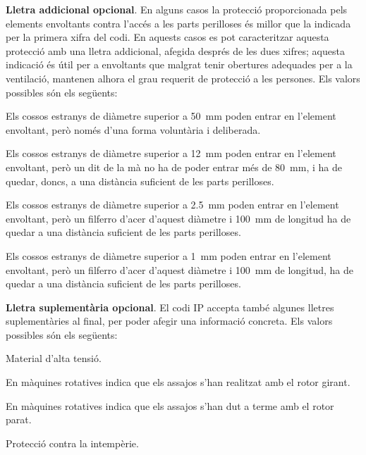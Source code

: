 \textbf{Lletra addicional opcional}. En alguns casos la protecció
proporcionada pels elements envoltants contra l'accés a les parts
perilloses és millor que la indicada per la primera xifra del codi.
En aquests casos es pot caracteritzar aquesta protecció amb una
lletra addicional, afegida després de les dues xifres; aquesta indicació és útil per a  envoltants que malgrat tenir obertures adequades per a la ventilació,  mantenen alhora el
grau requerit de protecció a les persones. Els valors possibles són
els següents:
\begin{list}{}
	{\setlength{\labelwidth}{10mm} \setlength{\leftmargin}{15mm} \setlength{\labelsep}{5mm}}
	\item[A] Els  cossos estranys de diàmetre superior a
	\qty{50}{mm}    poden entrar en l'element envoltant, però només d'una forma voluntària i deliberada.
	\item[B] Els  cossos estranys de diàmetre superior a \qty{12}{mm}
	poden entrar en l'element envoltant, però un dit de la mà no ha de poder entrar més de \qty{80}{mm}, i
	ha de quedar, doncs, a una distància    suficient de les parts perilloses.
	\item[C] Els  cossos estranys de diàmetre superior a \qty{2,5}{mm}
	poden entrar en l'element envoltant, però un filferro d'acer d'aquest diàmetre i \qty{100}{mm}
	de longitud ha de quedar a una distància suficient de les parts perilloses.
	\item[D] Els  cossos estranys de diàmetre superior a \qty{1}{mm}
	poden entrar en l'element envoltant, però un filferro d'acer d'aquest diàmetre i \qty{100}{mm}
	de longitud, ha de quedar a una distància suficient de les parts perilloses.
\end{list}

\textbf{Lletra suplementària opcional}. El codi IP accepta també algunes
lletres suplementàries al final, per poder afegir una informació concreta. Els valors
possibles són els següents:
\begin{list}{}
	{\setlength{\labelwidth}{10mm} \setlength{\leftmargin}{15mm} \setlength{\labelsep}{5mm}}
	\item[H] Material d'alta tensió.
	\item[M] En màquines rotatives indica que els assajos s'han realitzat amb el
	rotor girant.
	\item[S] En màquines rotatives indica que els assajos s'han dut a terme amb el
	rotor parat.
	\item[W] Protecció contra la intempèrie.
\end{list}


